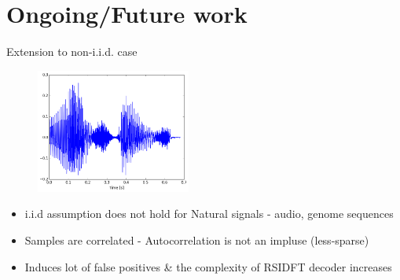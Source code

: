\documentclass[10pt,xcolor=table]{beamer}
\begin{document}
\section{Ongoing/Future work}
\begin{frame}{Extension to non-i.i.d. case}


\begin{figure}[t]
	\begin{center}
		\includegraphics[width=2.0in]{audio_signal.png}
	\end{center}
\end{figure}

\begin{block}{}
	\begin{itemize}
		\item {\color{blue}i.i.d assumption} does not hold for {\color{blue}Natural signals} - audio, genome sequences
		\item Samples are {\color{blue} correlated} - Autocorrelation is not an impluse (less-sparse)
		\item Induces lot of false positives \& the complexity of RSIDFT decoder increases 		
	\end{itemize}	
\end{block}
\end{frame}
\end{document}
